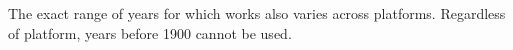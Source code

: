 The exact range of years for which  works also
varies across platforms.  Regardless of platform, years before 1900
cannot be used.


\begin{comment}

\subsection{C API}

Struct typedefs:

    PyDateTime_Date
    PyDateTime_DateTime
    PyDateTime_DateTimeTZ
    PyDateTime_Time
    PyDateTime_TimeTZ
    PyDateTime_Delta
    PyDateTime_TZInfo

Type-check macros:

    PyDate_Check(op)
    PyDate_CheckExact(op)

    PyDateTime_Check(op)
    PyDateTime_CheckExact(op)

    PyDateTimeTZ_Check(op)
    PyDateTimeTZ_CheckExact(op)

    PyTime_Check(op)
    PyTime_CheckExact(op)

    PyTimeTZ_Check(op)
    PyTimeTZ_CheckExact(op)

    PyDelta_Check(op)
    PyDelta_CheckExact(op)

    PyTZInfo_Check(op)
    PyTZInfo_CheckExact(op)

Accessor macros:

All objects are immutable, so accessors are read-only.  All macros
return ints:

    For \class{date}, \class{datetime}, and \class{datetimetz} instances:
        PyDateTime_GET_YEAR(o)
        PyDateTime_GET_MONTH(o)
        PyDateTime_GET_DAY(o)

    For \class{datetime} and \class{datetimetz} instances:
        PyDateTime_DATE_GET_HOUR(o)
        PyDateTime_DATE_GET_MINUTE(o)
        PyDateTime_DATE_GET_SECOND(o)
        PyDateTime_DATE_GET_MICROSECOND(o)

    For \class{time} and \class{timetz} instances:
        PyDateTime_TIME_GET_HOUR(o)
        PyDateTime_TIME_GET_MINUTE(o)
        PyDateTime_TIME_GET_SECOND(o)
        PyDateTime_TIME_GET_MICROSECOND(o)

\end{comment}
